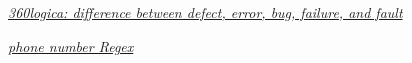 {\begin{latin}
\begin{thebibliography}{9}
	\textit{\href{https://www.360logica.com/blog/difference-between-defect-error-bug-failure-and-fault/
	}{360logica: difference between defect, error, bug, failure, and fault}}

	\textit{\href{https://www.datisnetwork.com/phone-number-regex.html}{phone number Regex}}

\end{thebibliography}
\endgroup
\end{latin}

}

